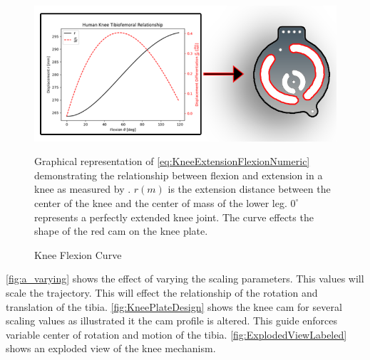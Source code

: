 \begin{figure}[ht!]
    \centering
    \includegraphics[scale=0.9]{images/mech_design/knee_plate_main_annotated.png}
    \caption{Knee Flexion Curve}{Graphical representation of \autoref{eq:KneeExtensionFlexionNumeric} demonstrating the relationship between flexion and extension in a knee as measured by \cite{KinDynKneeJoint}. \(r(m)\) is the extension distance between the center of the knee and the center of mass of the lower leg. $0^\circ$ represents a perfectly extended knee joint. The curve effects the shape of the red cam on the knee plate. }
    \label{fig:FlexExtRelationship}
\end{figure} 


\autoref{fig:a_varying} shows the effect of varying the scaling parameters. This values will scale the trajectory. This will effect the relationship of the rotation and translation of the tibia. \autoref{fig:KneePlateDesign} shows the knee cam for several scaling values as illustrated it the cam profile is altered. This guide enforces variable center of rotation and motion of the tibia. \autoref{fig:ExplodedViewLabeled} shows an exploded view of the knee mechanism. 

